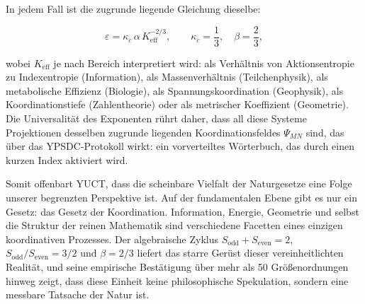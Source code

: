 \documentclass[12pt]{article}
\newcommand{\Sodd}{S_{\mathrm{odd}}}
\newcommand{\Seven}{S_{\mathrm{even}}}
\begin{document}
	In jedem Fall ist die zugrunde liegende Gleichung dieselbe:
	
	\begin{equation}
		\boxed{ \varepsilon = \kappa_c \, \alpha \, K_{\mathrm{eff}}^{-2/3} },
		\qquad \kappa_c = \frac{1}{3},\quad \beta = \frac{2}{3},
	\end{equation}
	
	wobei \(K_{\mathrm{eff}}\) je nach Bereich interpretiert wird: als Verhältnis von Aktionsentropie zu Indexentropie (Information), als Massenverhältnis (Teilchenphysik), als metabolische Effizienz (Biologie), als Spannungskoordination (Geophysik), als Koordinationstiefe (Zahlentheorie) oder als metrischer Koeffizient (Geometrie). Die Universalität des Exponenten rührt daher, dass all diese Systeme Projektionen desselben zugrunde liegenden Koordinationsfeldes \(\Psi_{MN}\) sind, das über das YPSDC-Protokoll wirkt: ein vorverteiltes Wörterbuch, das durch einen kurzen Index aktiviert wird.
	
	Somit offenbart YUCT, dass die scheinbare Vielfalt der Naturgesetze eine Folge unserer begrenzten Perspektive ist. Auf der fundamentalen Ebene gibt es nur ein Gesetz: das Gesetz der Koordination. Information, Energie, Geometrie und selbst die Struktur der reinen Mathematik sind verschiedene Facetten eines einzigen koordinativen Prozesses. Der algebraische Zyklus \(\Sodd + \Seven = 2\), \(\Sodd/\Seven = 3/2\) und \(\beta = 2/3\) liefert das starre Gerüst dieser vereinheitlichten Realität, und seine empirische Bestätigung über mehr als 50 Größenordnungen hinweg zeigt, dass diese Einheit keine philosophische Spekulation, sondern eine messbare Tatsache der Natur ist.
	
\end{document}
